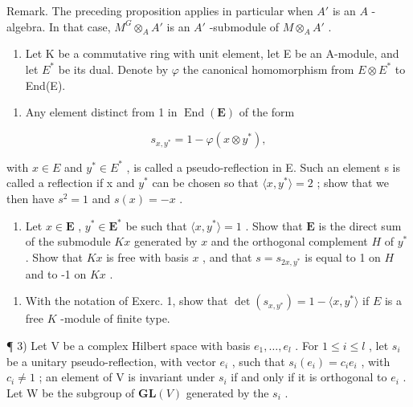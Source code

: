 Remark. The preceding proposition applies in particular when \(A'\) is an \(A\) -algebra. In that case, \(M^G \otimes_A A'\) is an \(A'\) -submodule of \(M \otimes_A A'\) .


\begin{enumerate}
\def\labelenumi{\arabic{enumi})}
\tightlist
\item
  Let K be a commutative ring with unit element, let E be an A-module, and let \(E^{*}\) be its dual. Denote by \(\varphi\) the canonical homomorphism from \(E \otimes E^{*}\) to End(E).
\end{enumerate}

\begin{enumerate}
\def\labelenumi{\alph{enumi})}
\tightlist
\item
  Any element distinct from 1 in \(\operatorname{End}(\mathbf{E})\) of the form
\end{enumerate}

\[
s _ {x, y ^ {*}} = 1 - \varphi (x \otimes y ^ {*}),
\]

with \(x \in E\) and \(y^{*} \in E^{*}\) , is called a pseudo-reflection in E. Such an element s is called a reflection if x and \(y^{*}\) can be chosen so that \(\langle x, y^{*} \rangle = 2\) ; show that we then have \(s^{2} = 1\) and \(s(x) = -x\) .

\begin{enumerate}
\def\labelenumi{\alph{enumi})}
\setcounter{enumi}{1}
\tightlist
\item
  Let \(x \in \mathbf{E}\) , \(y^{*} \in \mathbf{E}^{*}\) be such that \(\langle x, y^{*} \rangle = 1\) . Show that \(\mathbf{E}\) is the direct sum of the submodule \(Kx\) generated by \(x\) and the orthogonal complement \(H\) of \(y^{*}\) . Show that \(Kx\) is free with basis \(x\) , and that \(s = s_{2x,y^*}\) is equal to 1 on \(H\) and to -1 on \(Kx\) .
\end{enumerate}

\begin{enumerate}
\def\labelenumi{\arabic{enumi})}
\setcounter{enumi}{1}
\tightlist
\item
  With the notation of Exerc. 1, show that \(\det(s_{x,y^*}) = 1 - \langle x, y^* \rangle\) if \(E\) is a free \(K\) -module of finite type.
\end{enumerate}

¶ 3) Let V be a complex Hilbert space with basis \(e_1, \ldots, e_l\) . For \(1 \leqslant i \leqslant l\) , let \(s_i\) be a unitary pseudo-reflection, with vector \(e_i\) , such that \(s_i(e_i) = c_i e_i\) , with \(c_i \neq 1\) ; an element of V is invariant under \(s_i\) if and only if it is orthogonal to \(e_i\) . Let W be the subgroup of \(\mathbf{GL}(V)\) generated by the \(s_i\) .

